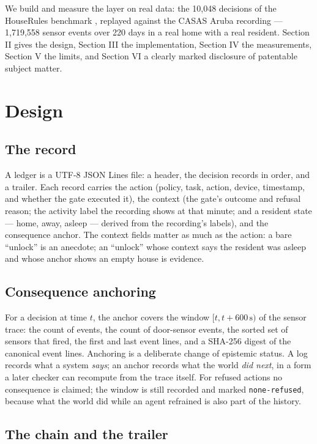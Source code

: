 \documentclass[journal]{IEEEtran}
\begin{document}
We build and measure the layer on real data: the 10,048 decisions of
the HouseRules benchmark \cite{hourules}, replayed against the CASAS
Aruba recording \cite{casas} --- 1,719,558 sensor events over 220 days
in a real home with a real resident. Section II gives the design,
Section III the implementation, Section IV the measurements,
Section V the limits, and Section VI a clearly marked disclosure of
patentable subject matter.

\section{Design}

\subsection{The record}

A ledger is a UTF-8 JSON Lines file: a header, the decision records in
order, and a trailer. Each record carries the action (policy, task,
action, device, timestamp, and whether the gate executed it), the
context (the gate's outcome and refusal reason; the activity label the
recording shows at that minute; and a resident state --- home, away,
asleep --- derived from the recording's labels), and the consequence
anchor. The context fields matter as much as the action: a bare
``unlock'' is an anecdote; an ``unlock'' whose context says the
resident was asleep and whose anchor shows an empty house is evidence.

\subsection{Consequence anchoring}

For a decision at time $t$, the anchor covers the window
$[t, t+600\,\mathrm{s})$ of the sensor trace: the count of events, the
count of door-sensor events, the sorted set of sensors that fired, the
first and last event lines, and a SHA-256 digest of the canonical
event lines. Anchoring is a deliberate change of epistemic status. A
log records what a system \emph{says}; an anchor records what the
world \emph{did next}, in a form a later checker can recompute from
the trace itself. For refused actions no consequence is claimed; the
window is still recorded and marked \texttt{none-refused}, because
what the world did while an agent refrained is also part of the
history.

\subsection{The chain and the trailer}
\end{document}
